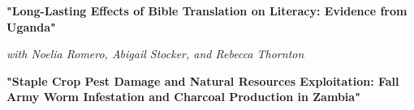 \documentclass[letterpaper,11pt]{article}
\begin{document}
    \hspace{3mm}
    \textbf{"Long-Lasting Effects of Bible Translation on Literacy: Evidence from Uganda"} 

    \hspace{3mm}
    \textit{with Noelia Romero, Abigail Stocker, and Rebecca Thornton}
    \vspace{3mm}

    \hspace{3mm}
    \textbf{"Staple Crop Pest Damage and Natural Resources Exploitation: Fall Army Worm Infestation and Charcoal Production in Zambia"} 
    
\end{document}
